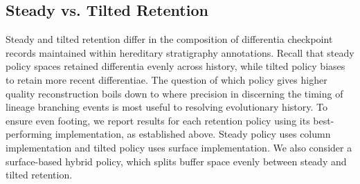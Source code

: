 



\subsection{Steady vs. Tilted Retention} \label{sec:steady-vs-tilted}



Steady and tilted retention differ in the composition of differentia checkpoint records maintained within hereditary stratigraphy annotations.
Recall that steady policy spaces retained differentia evenly across history, while tilted policy biases to retain more recent differentiae.
The question of which policy gives higher quality reconstruction boils down to where precision in discerning the timing of lineage branching events is most useful to resolving evolutionary history.
To ensure even footing, we report results for each retention policy using its best-performing implementation, as established above.
Steady policy uses column implementation and tilted policy uses surface implementation.
We also consider a surface-based hybrid policy, which splits buffer space evenly between steady and tilted retention.


